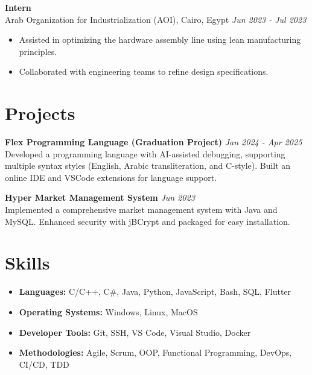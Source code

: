 \documentclass[a4paper,10pt]{article}
\begin{document}
\textbf{Intern} \\
Arab Organization for Industrialization (AOI), Cairo, Egypt \hfill \textit{Jun 2023 - Jul 2023}
\begin{itemize}[leftmargin=0.15in]
    \item Assisted in optimizing the hardware assembly line using lean manufacturing principles.
    \item Collaborated with engineering teams to refine design specifications.
\end{itemize}

\section*{Projects}
\textbf{Flex Programming Language (Graduation Project)} \hfill \textit{Jan 2024 - Apr 2025} \\
Developed a programming language with AI-assisted debugging, supporting multiple syntax styles (English, Arabic transliteration, and C-style). Built an online IDE and VSCode extensions for language support.

\textbf{Hyper Market Management System} \hfill \textit{Jun 2023} \\
Implemented a comprehensive market management system with Java and MySQL. Enhanced security with jBCrypt and packaged for easy installation.

\section*{Skills}
\begin{itemize}[leftmargin=0.15in]
    \item \textbf{Languages:} C/C++, C\#, Java, Python, JavaScript, Bash, SQL, Flutter
    \item \textbf{Operating Systems:} Windows, Linux, MacOS
    \item \textbf{Developer Tools:} Git, SSH, VS Code, Visual Studio, Docker
    \item \textbf{Methodologies:} Agile, Scrum, OOP, Functional Programming, DevOps, CI/CD, TDD
\end{itemize}
\end{document}
